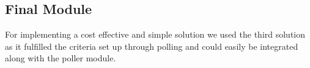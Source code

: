 \subsection{Final Module}
{\normalsize For implementing a cost effective and simple solution we used the third solution as it fulfilled the criteria set up through polling and could easily be integrated along with the poller module.
}
 




